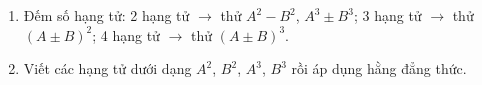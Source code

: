 \begin{enumerate}
\item Đếm số hạng tử: 2 hạng tử $\to$ thử $A^2-B^2$, $A^3\pm B^3$; 3 hạng tử $\to$ thử $(A\pm B)^2$; 4 hạng tử $\to$ thử $(A\pm B)^3$.
\item Viết các hạng tử dưới dạng $A^2$, $B^2$, $A^3$, $B^3$ rồi áp dụng hằng đẳng thức.
\end{enumerate}
